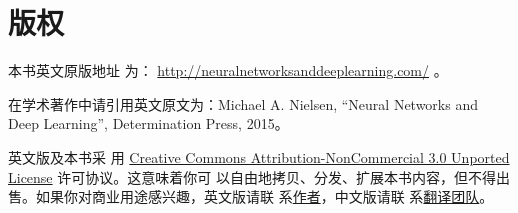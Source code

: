 
\chapter{版权}

本书英文原版地址
为：
\href{http://neuralnetworksanddeeplearning.com/}{http://neuralnetworksanddeeplearning.com/}
。

在学术著作中请引用英文原文为：Michael A. Nielsen, ``Neural Networks and Deep
Learning'', Determination Press, 2015。

英文版及本书采
用 \href{http://creativecommons.org/licenses/by-nc/3.0/deed.en_GB}{Creative
  Commons Attribution-NonCommercial 3.0 Unported License} 许可协议。这意味着你可
以自由地拷贝、分发、扩展本书内容，但不得出售。如果你对商业用途感兴趣，英文版请联
系\href{mailto:mn@michaelnielsen.org}{作者}，中文版请联
系\hyperref[sec:TranslationTeam]{翻译团队}。
